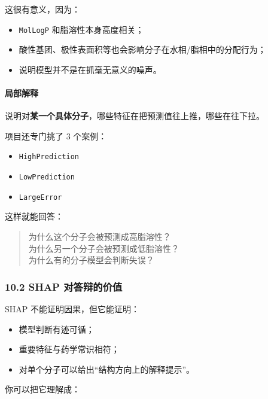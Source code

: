 \documentclass[
  ,
]{ctexart}
\providecommand{\tightlist}{%
  \setlength{\itemsep}{0pt}\setlength{\parskip}{0pt}}
\begin{document}
这很有意义，因为：

\begin{itemize}
\tightlist
\item
  \texttt{MolLogP} 和脂溶性本身高度相关；
\item
  酸性基团、极性表面积等也会影响分子在水相/脂相中的分配行为；
\item
  说明模型并不是在抓毫无意义的噪声。
\end{itemize}

\hypertarget{ux5c40ux90e8ux89e3ux91ca}{%
\paragraph{局部解释}\label{ux5c40ux90e8ux89e3ux91ca}}

说明对\textbf{某一个具体分子}，哪些特征在把预测值往上推，哪些在往下拉。

项目还专门挑了 3 个案例：

\begin{itemize}
\tightlist
\item
  \texttt{HighPrediction}
\item
  \texttt{LowPrediction}
\item
  \texttt{LargeError}
\end{itemize}

这样就能回答：

\begin{quote}
为什么这个分子会被预测成高脂溶性？\\
为什么另一个分子会被预测成低脂溶性？\\
为什么有的分子模型会判断失误？
\end{quote}

\hypertarget{shap-ux5bf9ux7b54ux8fa9ux7684ux4ef7ux503c}{%
\subsubsection{10.2 SHAP
对答辩的价值}\label{shap-ux5bf9ux7b54ux8fa9ux7684ux4ef7ux503c}}

SHAP 不能证明因果，但它能证明：

\begin{itemize}
\tightlist
\item
  模型判断有迹可循；
\item
  重要特征与药学常识相符；
\item
  对单个分子可以给出``结构方向上的解释提示''。
\end{itemize}

你可以把它理解成：
\end{document}
